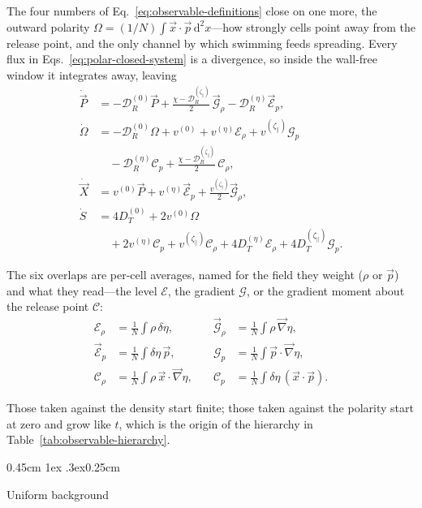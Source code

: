 \documentclass[
  reprint,
  superscriptaddress,
  amsmath,
  amssymb,
  aps,
  pre,
  nofootinbib,
  floatfix
]{revtex4-2}
\makeatletter
\newcommand{\pv}{\vec p}
\newcommand{\grad}{\vec{\nabla}}
\newcommand{\dd}{\mathrm d}
\newcommand{\DR}{\mathcal D_R^{(0)}}
\newcommand{\zp}{\zeta_\parallel}
\newcommand{\Pnet}{\vec P}
\newcommand{\Xc}{\vec X}
\newcommand{\Erho}{\mathcal E_\rho}
\newcommand{\Crho}{\mathcal C_\rho}
\newcommand{\Gp}{\mathcal G_p}
\newcommand{\Cp}{\mathcal C_p}
\newcommand{\Gv}{\vec{\mathcal G}_\rho}
\newcommand{\Piv}{\vec{\mathcal E}_p}
\def\subsection{\@startsection{subsection}{2}{\z@}%
  {0.45cm \@plus1ex \@minus.3ex}{0.25cm}%
  {\normalfont\small\bfseries\raggedright}}%
\makeatother
\begin{document}
The four numbers of Eq.~\eqref{eq:observable-definitions} close on one more,
the outward polarity $\Omega=(1/N)\int\vec x\cdot\pv\,\dd^2x$---how strongly
cells point away from the release point, and the only channel by which
swimming feeds spreading.  Every flux in Eqs.~\eqref{eq:polar-closed-system}
is a divergence, so inside the wall-free window it integrates away, leaving
\begin{subequations}
\label{eq:observable-balance}
\begin{align}
 \dot\Pnet&=-\DR\Pnet
 +\frac{\chi-\mathcal D_R^{(\zp)}}{2}\,\Gv
 -\mathcal D_R^{(\eta)}\Piv,
 \label{eq:observable-polarity}\\
 \dot\Omega&=-\DR\Omega+v^{(0)}
 +v^{(\eta)}\Erho+v^{(\zp)}\Gp
 \nonumber\\&\quad
 -\mathcal D_R^{(\eta)}\Cp
 +\frac{\chi-\mathcal D_R^{(\zp)}}{2}\,\Crho,
 \label{eq:observable-outward}\\
 \dot\Xc&=v^{(0)}\Pnet+v^{(\eta)}\Piv+\frac{v^{(\zp)}}{2}\Gv,
 \label{eq:observable-centroid}\\
 \dot S&=4D_T^{(0)}+2v^{(0)}\Omega
 \nonumber\\&\quad
 +2v^{(\eta)}\Cp+v^{(\zp)}\Crho+4D_T^{(\eta)}\Erho+4D_T^{(\zp)}\Gp .
 \label{eq:observable-spread}
\end{align}
\end{subequations}

The six overlaps are per-cell averages, named for the field they weight
($\rho$ or $\pv$) and what they read---the level $\mathcal E$, the gradient
$\mathcal G$, or the gradient moment about the release point $\mathcal C$:
\begin{equation}
\begin{aligned}
 \Erho&=\frac1N\int\rho\,\delta\eta, &\quad \Gv&=\frac1N\int\rho\,\grad\eta,\\
 \Piv&=\frac1N\int\delta\eta\,\pv, &\quad \Gp&=\frac1N\int\pv\cdot\grad\eta,\\
 \Crho&=\frac1N\int\rho\,\vec x\cdot\grad\eta, &\quad \Cp&=\frac1N\int\delta\eta\,(\vec x\cdot\pv).
\end{aligned}
 \label{eq:observable-overlaps}
\end{equation}

Those taken against the density start finite; those taken against the polarity
start at zero and grow like $t$, which is the origin of the hierarchy in
Table~\ref{tab:observable-hierarchy}.

\subsection{Uniform background}
\end{document}
